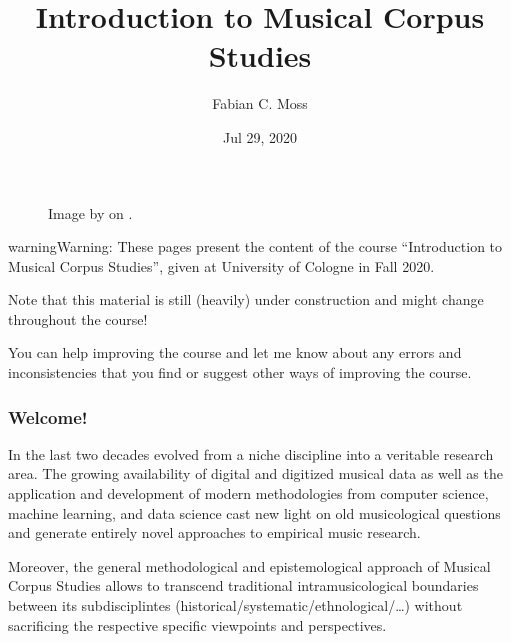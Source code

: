 \documentclass[letterpaper,10pt,english]{sphinxmanual}
\title{Introduction to Musical Corpus Studies}
\date{Jul 29, 2020}
\author{Fabian C.\@{} Moss}
\begin{document}
\pagestyle{empty}
\sphinxmaketitle
\pagestyle{plain}
\sphinxtableofcontents
\pagestyle{normal}
\label{\detokenize{index::doc}}
\begin{figure}[htbp]
\centering
\capstart

\noindent{}
\caption{Image by 
on .}\label{\detokenize{index:id1}}\end{figure}



\begin{sphinxadmonition}{warning}{Warning:}
These pages present the content of the course “Introduction to Musical Corpus Studies”,
given at University of Cologne in Fall 2020.

Note that this material is still (heavily) under construction and might change throughout the course!

You can help improving the course and let me know about any errors and inconsistencies that you find
or suggest other ways of improving the course.
\end{sphinxadmonition}
\subsubsection*{Welcome!}

In the last two decades  evolved from a niche discipline into a veritable research area.
The growing availability of digital and digitized musical data as well as the application and development of modern
methodologies from computer science, machine learning, and data science cast new light on old musicological questions
and generate entirely novel approaches to empirical music research.

Moreover, the general methodological and epistemological approach of Musical Corpus Studies allows to transcend traditional
intra\sphinxhyphen{}musicological boundaries between its sub\sphinxhyphen{}disciplintes (historical/systematic/ethnological/…) without sacrificing the
respective specific viewpoints and perspectives.
\end{document}
